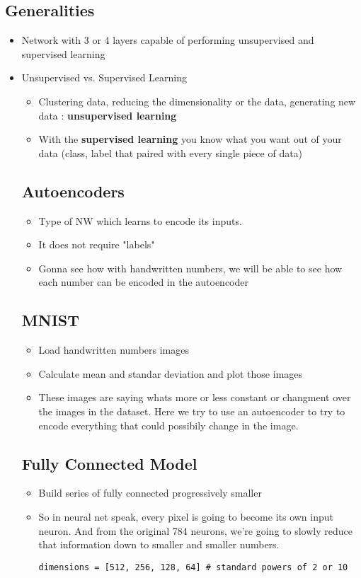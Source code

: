\documentclass[12pt,a4paper]{article}
\begin{document}
\subsection{Generalities}
\begin{itemize}
\item Network with 3 or 4 layers capable of performing unsupervised and supervised learning
\item Unsupervised vs. Supervised Learning
\begin{itemize}
\item Clustering data, reducing the dimensionality or the data, generating new data : \textbf{unsupervised learning}
\item With the \textbf{supervised learning} you know what you want out of your data (class, label that paired with every single piece of data)
\end{itemize}
\subsection{Autoencoders}
\begin{itemize}
\item Type of NW which learns to encode its inputs.
\item It does not require "labels"
\item Gonna see how with handwritten numbers, we will be able to see how each number can be encoded in the autoencoder
\end{itemize}
\subsection{MNIST}
\begin{itemize}
\item Load handwritten numbers images
\item Calculate mean and standar deviation and plot those images
\item These images are saying whats more or less constant or changment over the images in the dataset. Here we try to use an autoencoder to try to encode everything that could possibily change in the image.
\end{itemize}
\subsection{Fully Connected Model}
\begin{itemize}
\item Build series of fully connected progressively smaller
\item So in neural net speak, every pixel is going to become its own input neuron. And from the original 784 neurons, we're going to slowly reduce that information down to smaller and smaller numbers.
\begin{lstlisting}
dimensions = [512, 256, 128, 64] # standard powers of 2 or 10
\end{lstlisting}
\end{itemize}

\end{itemize}
\end{document}
